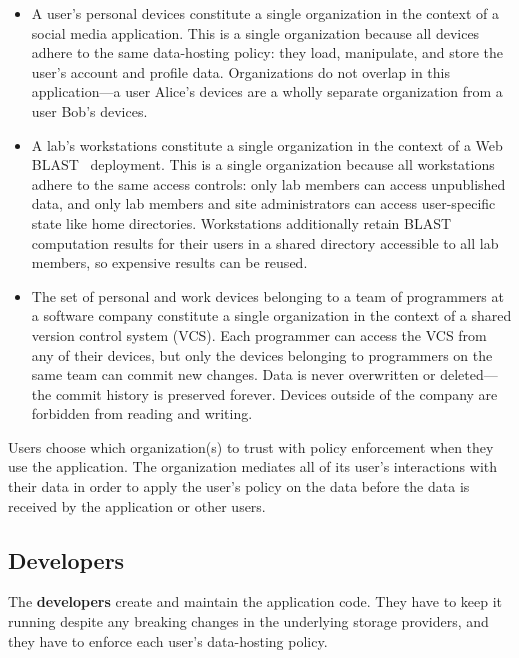 \begin{itemize}
   \item A user's personal devices constitute a single organization in the context of a
      social media application.  This is a single organization because all
      devices adhere to the same data-hosting policy:  they load, manipulate,
      and store the user's account and profile data.  Organizations do not
      overlap in this application---a user Alice's devices are a wholly
      separate organization from a user Bob's devices.
   \item A lab's workstations constitute a single organization in the context of
      a Web BLAST~\cite{web-blast} deployment.  This is a single organization
      because all workstations adhere to the same access controls:  only lab members
      can access unpublished data, and only lab members and site
      administrators can access user-specific state like home directories.
      Workstations additionally retain BLAST computation results for their users
      in a shared directory accessible to all lab members, so expensive results
      can be reused.
   \item The set of personal and work devices belonging to a team of programmers
      at a software company constitute a single organization in
      the context of a shared version control system (VCS).
      Each programmer can access the VCS from any of their devices, but only the
      devices belonging to programmers on the same team can commit new changes.
      Data is never overwritten or deleted---the commit history is preserved
      forever.  Devices outside of the company are forbidden from reading and writing.
\end{itemize}

Users choose which organization(s) to trust with policy enforcement when they
use the application.  The organization mediates all of its user's interactions
with their data in order to apply the user's policy on the data before the data
is received by the application or other users.

\subsection{Developers}

The \textbf{developers} create and maintain the application code.  They have to
keep it running despite any breaking changes in the underlying storage
providers, and they have to enforce each user's data-hosting policy.

